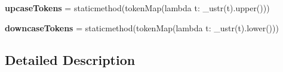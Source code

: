 \begin{DoxyCompactItemize}
\item 
\mbox{\label{classsetuptools_1_1__vendor_1_1pyparsing_1_1pyparsing__common_a934d196b47af1307763b61220e50aca0}} 
{\bfseries upcase\+Tokens} = staticmethod(token\+Map(lambda t\+: \+\_\+ustr(t).upper()))
\item 
\mbox{\label{classsetuptools_1_1__vendor_1_1pyparsing_1_1pyparsing__common_a7d0506438006f5fe8bae994125a11536}} 
{\bfseries downcase\+Tokens} = staticmethod(token\+Map(lambda t\+: \+\_\+ustr(t).lower()))
\end{DoxyCompactItemize}


\subsection{Detailed Description}
